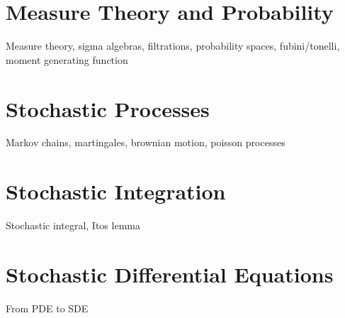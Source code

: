 \section{Measure Theory and Probability}
Measure theory, sigma algebras, filtrations, probability spaces,
fubini/tonelli, moment generating function

\section{Stochastic Processes}
Markov chains, martingales, brownian motion, poisson processes

\section{Stochastic Integration}
Stochastic integral, Itos lemma

\section{Stochastic Differential Equations}
From PDE to SDE
